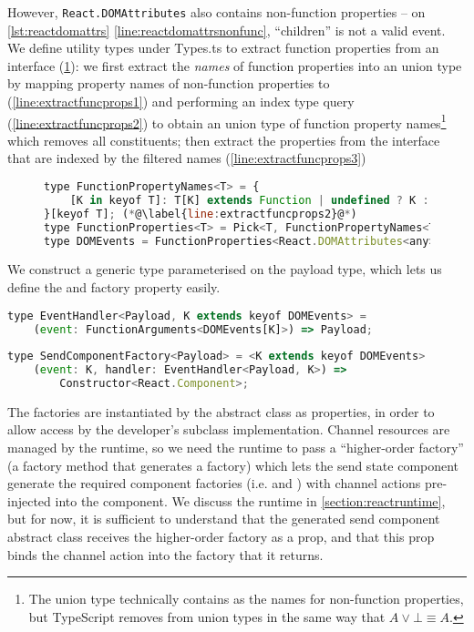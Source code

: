 However, \texttt{React.DOMAttributes} also contains
non-function properties -- on \cref{lst:reactdomattrs}
\cref{line:reactdomattrsnonfunc},  ``children'' is not a valid event.
We define utility types under Types.ts 
to extract function properties from an interface 
(\cref{lst:extractfuncprops}): we first extract
the \textit{names} of function properties into an union type 
by mapping property names of non-function properties to 
 (\cref{line:extractfuncprops1})
and performing an index type query (\cref{line:extractfuncprops2})
to obtain an union type of function property names\footnote{
The union type technically contains 
as the names for non-function properties, but 
TypeScript removes  from union types
in the same way that $A \vee \bot \equiv A$.
}
which removes all  constituents;
then extract the properties from the interface that are
indexed by the filtered names (\cref{line:extractfuncprops3})

\begin{figure}[!h]
\begin{lstlisting}[language=javascript,tabsize=2]
type FunctionPropertyNames<T> = {
	[K in keyof T]: T[K] extends Function | undefined ? K : never; (*@\label{line:extractfuncprops1}@*)
}[keyof T]; (*@\label{line:extractfuncprops2}@*)
type FunctionProperties<T> = Pick<T, FunctionPropertyNames<T>>; (*@\label{line:extractfuncprops3}@*)
type DOMEvents = FunctionProperties<React.DOMAttributes<any>>;
\end{lstlisting}
\label{lst:extractfuncprops}
\end{figure}

We construct a generic type parameterised on the payload type, 
which lets us define the  and 
factory property easily.

\begin{lstlisting}[language=javascript,numbers=none]
type EventHandler<Payload, K extends keyof DOMEvents> = 
	(event: FunctionArguments<DOMEvents[K]>) => Payload;
	
type SendComponentFactory<Payload> = <K extends keyof DOMEvents>
	(event: K, handler: EventHandler<Payload, K>) => 
		Constructor<React.Component>;
\end{lstlisting}

The factories are instantiated by the abstract class
as  properties, in order to allow 
access by the developer's subclass implementation.
Channel resources are managed by the runtime, so
we need the runtime to pass a ``higher-order factory''
(a factory method that generates a factory)
which lets the send state component generate the required
component factories (i.e.  and )
with channel actions pre-injected into the component.
We discuss the runtime in \cref{section:reactruntime},
but for now, it is sufficient to understand that
the generated send component abstract class receives
the higher-order factory as a prop, and that this
prop binds the channel action into the factory that it returns.

